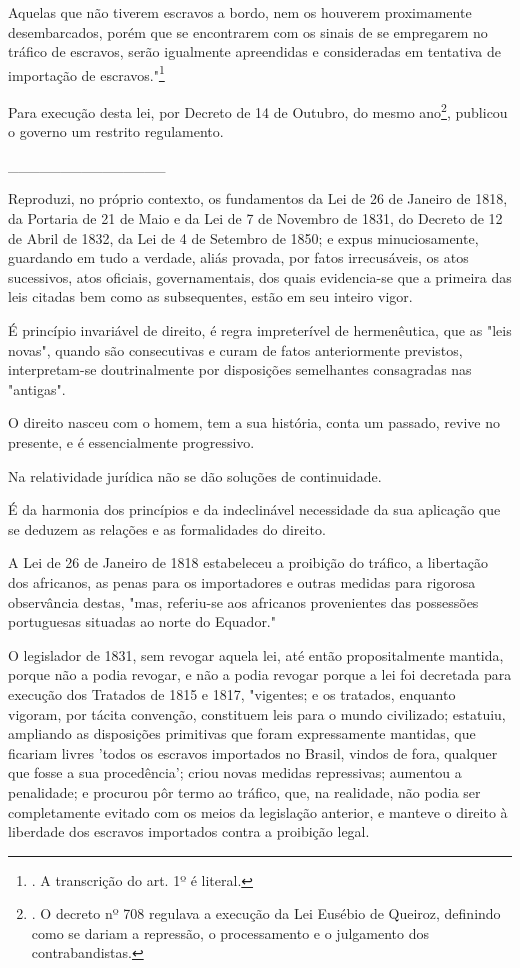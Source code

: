 Aquelas que não tiverem escravos a bordo, nem os houverem proximamente
desembarcados, porém que se encontrarem com os sinais de se empregarem
no tráfico de escravos, serão igualmente apreendidas e consideradas em
tentativa de importação de escravos."\footnote{. A transcrição do art.
  1º é literal.}

Para execução desta lei, por Decreto de 14 de Outubro, do mesmo
ano\footnote{. O decreto nº 708 regulava a execução da Lei Eusébio de
  Queiroz, definindo como se dariam a repressão, o processamento e o
  julgamento dos contrabandistas.}, publicou o governo um restrito
regulamento.

\_\_\_\_\_\_\_\_\_\_\_\_\_\_\_

Reproduzi, no próprio contexto, os fundamentos da Lei de 26 de Janeiro
de 1818, da Portaria de 21 de Maio e da Lei de 7 de Novembro de 1831, do
Decreto de 12 de Abril de 1832, da Lei de 4 de Setembro de 1850; e expus
minuciosamente, guardando em tudo a verdade, aliás provada, por fatos
irrecusáveis, os atos sucessivos, atos oficiais, governamentais, dos
quais evidencia-se que a primeira das leis citadas bem como as
subsequentes, estão em seu inteiro vigor.

É princípio invariável de direito, é regra impreterível de hermenêutica,
que as "leis novas", quando são consecutivas e curam de fatos
anteriormente previstos, interpretam-se doutrinalmente por disposições
semelhantes consagradas nas "antigas".

O direito nasceu com o homem, tem a sua história, conta um passado,
revive no presente, e é essencialmente progressivo.

Na relatividade jurídica não se dão soluções de continuidade.

É da harmonia dos princípios e da indeclinável necessidade da sua
aplicação que se deduzem as relações e as formalidades do direito.

A Lei de 26 de Janeiro de 1818 estabeleceu a proibição do tráfico, a
libertação dos africanos, as penas para os importadores e outras medidas
para rigorosa observância destas, "mas, referiu-se aos africanos
provenientes das possessões portuguesas situadas ao norte do Equador."

O legislador de 1831, sem revogar aquela lei, até então propositalmente
mantida, porque não a podia revogar, e não a podia revogar porque a lei
foi decretada para execução dos Tratados de 1815 e 1817, "vigentes; e os
tratados, enquanto vigoram, por tácita convenção, constituem leis para o
mundo civilizado; estatuiu, ampliando as disposições primitivas que
foram expressamente mantidas, que ficariam livres 'todos os escravos
importados no Brasil, vindos de fora, qualquer que fosse a sua
procedência'; criou novas medidas repressivas; aumentou a penalidade; e
procurou pôr termo ao tráfico, que, na realidade, não podia ser
completamente evitado com os meios da legislação anterior, e manteve o
direito à liberdade dos escravos importados contra a proibição legal.

